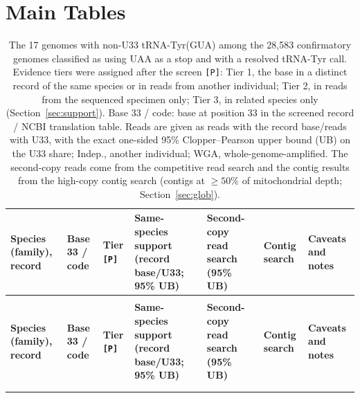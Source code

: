 \documentclass[11pt, a4paper]{article}
\begin{document}
\clearpage
\section*{Main Tables}

{\scriptsize
\setlength{\tabcolsep}{2.6pt}
\renewcommand{\arraystretch}{1.2}
\begin{longtable}{
  >{\raggedright\arraybackslash}p{3.0cm}
  >{\raggedright\arraybackslash}p{1.05cm}
  >{\raggedright\arraybackslash}p{1.25cm}
  >{\raggedright\arraybackslash}p{2.75cm}
  >{\raggedright\arraybackslash}p{1.85cm}
  >{\raggedright\arraybackslash}p{1.75cm}
  >{\raggedright\arraybackslash}p{2.55cm}
}
\caption{The 17 genomes with non-U33 tRNA-Tyr(GUA) among the 28,583 confirmatory genomes classified as using UAA as a stop and with a resolved tRNA-Tyr call. Evidence tiers were assigned after the screen \texttt{[P]}: Tier 1, the base in a distinct record of the same species or in reads from another individual; Tier 2, in reads from the sequenced specimen only; Tier 3, in related species only (Section~\ref{sec:support}). Base 33 / code: base at position 33 in the screened record / NCBI translation table. Reads are given as reads with the record base/reads with U33, with the exact one-sided 95\% Clopper--Pearson upper bound (UB) on the U33 share; Indep., another individual; WGA, whole-genome-amplified. The second-copy reads come from the competitive read search and the contig results from the high-copy contig search (contigs at $\ge 50\%$ of mitochondrial depth; Section~\ref{sec:glob}).}\label{tab:hits}\\
\toprule
\textbf{Species (family), record} & \textbf{Base 33 / code} & \textbf{Tier \texttt{[P]}} & \textbf{Same-species support (record base/U33; 95\% UB)} & \textbf{Second-copy read search (95\% UB)} & \textbf{Contig search} & \textbf{Caveats and notes} \\
\midrule
\endfirsthead
\multicolumn{7}{l}{\footnotesize\textit{Table~\ref{tab:hits} continued from previous page}}\\
\toprule
\textbf{Species (family), record} & \textbf{Base 33 / code} & \textbf{Tier \texttt{[P]}} & \textbf{Same-species support (record base/U33; 95\% UB)} & \textbf{Second-copy read search (95\% UB)} & \textbf{Contig search} & \textbf{Caveats and notes} \\
\midrule
\endhead
\midrule
\multicolumn{7}{r}{\footnotesize\textit{Continued on next page}}\\
\endfoot
\bottomrule
\endlastfoot


\end{longtable}}
\end{document}
